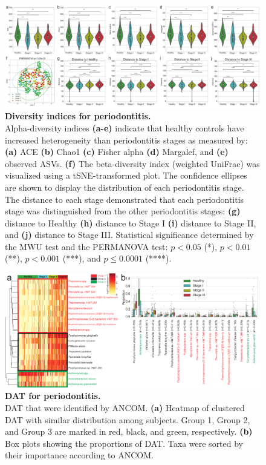 \documentclass[11pt, a4paper, onecolumn, oneside]{report}
\begin{document}
            \begin{figure}[p]
                \centering
                \includegraphics[width=\linewidth]{Figures/Periodontitis/Figure_1.pdf}
                \caption[Diversity indices for periodontitis]{\textbf{Diversity indices for periodontitis.}\\
                    Alpha-diversity indices \textbf{(a-e)} indicate that healthy controls have increased heterogeneity than periodontitis stages as measured by: \textbf{(a)} ACE \textbf{(b)} Chao1 \textbf{(c)} Fisher alpha \textbf{(d)} Margalef, and \textbf{(e)} observed ASVs. \textbf{(f)} The beta-diversity index (weighted UniFrac) was visualized using a tSNE-transformed plot. The confidence ellipses are shown to display the distribution of each periodontitis stage. The distance to each stage demonstrated that each periodontitis stage was distinguished from the other periodontitis stages: \textbf{(g)} distance to Healthy \textbf{(h)} distance to Stage I \textbf{(i)} distance to Stage II, and \textbf{(j)} distance to Stage III. Statistical significance determined by the MWU test and the PERMANOVA test: $p < 0.05$ (*), $p < 0.01$ (**), $p < 0.001$ (***), and $p \le 0.0001$ (****).}
                \label{fig:Periodontitis-diversity}
            \end{figure}
            \clearpage

            \begin{figure}[p]
                \centering
                \includegraphics[width=\linewidth]{Figures/Periodontitis/Figure_2.pdf}
                \caption[DAT for periodontitis]{\textbf{DAT for periodontitis.}\\
                    DAT that were identified by ANCOM. \textbf{(a)} Heatmap of clustered DAT with similar distribution among subjects. Group 1, Group 2, and Group 3 are marked in red, black, and green, respectively. \textbf{(b)} Box plots showing the proportions of DAT. Taxa were sorted by their importance according to ANCOM.}
                \label{fig:Periodontitis-DAT}
            \end{figure}
            \clearpage
\end{document}
